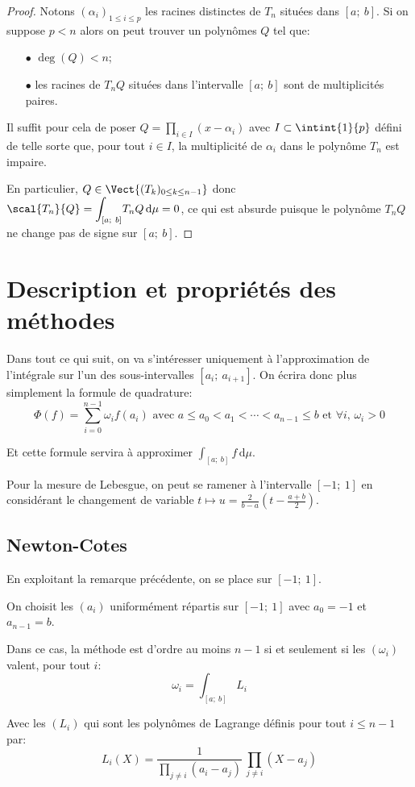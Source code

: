 \begin{proof}
Notons $(\alpha_i)_{1 \leq i \leq p}$ les racines distinctes de $T_n$ situées dans $[a;~b]$. Si on suppose $p < n$ alors on peut trouver un polynômes $Q$ tel que:
\begin{itemize}
\item[$\bullet$] 
$\deg(Q) < n$;
\item[$\bullet$] 
les racines de $T_n Q$ situées dans l'intervalle $[a;~b]$ sont de multiplicités paires.
\end{itemize}

Il suffit pour cela de poser $Q = \displaystyle{\prod \limits_{i \in I}} (x-\alpha_i)$ avec $I \subset \intint{1}{p}$ défini de telle sorte que, pour tout $i \in I$, la multiplicité de $\alpha_i$ dans le polynôme $T_n$ est impaire.

\medskip
En particulier, $Q \in \Vect{(T_k)_{0 \leq k \leq n-1}}$ donc $\scal{T_n}{Q} = \displaystyle{\int_{[a;~b]}} T_n Q \, \mathrm d \mu = 0$, ce qui est absurde puisque le polynôme $T_nQ$ ne change pas de signe sur $[a;~b]$.
\end{proof}

\section{Description et propriétés des méthodes}

Dans tout ce qui suit, on va s'intéresser uniquement à l'approximation de l'intégrale sur l'un des sous-intervalles $[a_i;~a_{i+1}]$. On écrira donc plus simplement la formule de quadrature:
\[
\Phi(f) = \displaystyle{\sum_{i=0}^{n-1}}  \omega_i f(a_i) \text{ avec } a \leq a_0 < a_1 <  \cdots < a_{n-1} \leq b \text{ et } \forall i, \, \omega_i > 0
\]

Et cette formule servira à approximer $\displaystyle{\int_{[a;~b]}} f \, \mathrm d \mu$.

\medskip
Pour la mesure de Lebesgue, on peut se ramener à l'intervalle $[-1;~1]$ en considérant le changement de variable $t \mapsto u = \frac{2}{b-a} \left ( t - \frac{a+b}{2} \right )$.

\subsection{Newton-Cotes}

En exploitant la remarque précédente, on se place sur $[-1;~1]$.

\begin{de}
On choisit les $(a_i)$ uniformément répartis sur $[-1;~1]$ avec $a_0 = -1$  et $a_{n-1} = b$. 

\medskip
Dans ce cas, la méthode est d'ordre au moins $n-1$ si et seulement si les $(\omega_i)$ valent, pour tout $i$:
\[
\omega_i = \displaystyle{\int_{[a;~b]}} L_i
\]

Avec les $(L_i)$ qui sont les polynômes de Lagrange définis pour tout $i \leq n-1$ par:
\[
L_i(X) = \frac{1}{\displaystyle{\prod \limits_{j \neq i}} (a_i-a_j)} \, \displaystyle{\prod \limits_{j \neq i}} (X-a_j)
\]
\end{de}

